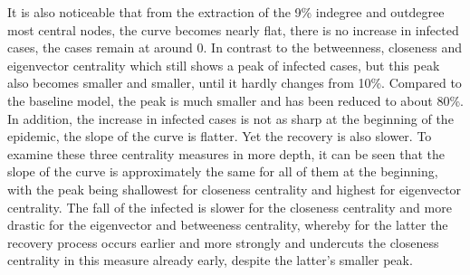 \documentclass{Template resources/netsci-project}
\begin{document}
It is also noticeable that from the extraction of the 9\% indegree and outdegree most central nodes, the curve becomes nearly flat, there is no increase in infected cases, the cases remain at around 0. In contrast to the betweenness, closeness and eigenvector centrality which still shows a peak of infected cases, but this peak also becomes smaller and smaller, until it hardly changes from 10\%. Compared to the baseline model, the peak is much smaller and has been reduced to about 80\%. In addition, the increase in infected cases is not as sharp at the beginning of the epidemic, the slope of the curve is flatter. Yet the recovery is also slower. To examine these three centrality measures in more depth, it can be seen that the slope of the curve is approximately the same for all of them at the beginning, with the peak being shallowest for closeness centrality and highest for eigenvector centrality. The fall of the infected is slower for the closeness centrality and more drastic for the eigenvector and betweeness centrality, whereby for the latter the recovery process occurs earlier and more strongly and undercuts the closeness centrality in this measure already early, despite the latter’s smaller peak.
\end{document}
